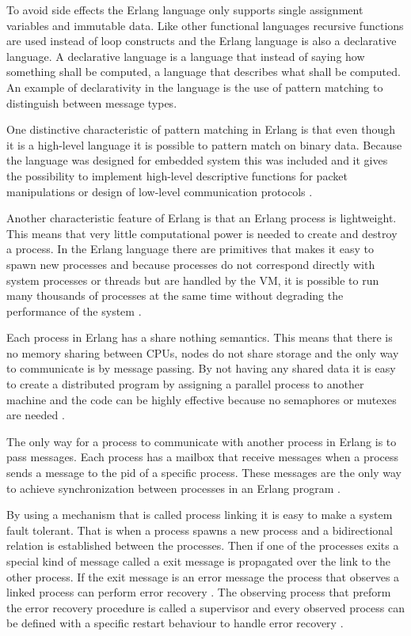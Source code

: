 To avoid side effects the Erlang language only supports single assignment variables and immutable data. Like other functional languages recursive functions are used instead of loop constructs and the Erlang language is also a declarative language. A declarative language is a language that instead of saying how something shall be computed, a language that describes what shall be computed. An example of declarativity in the language is the use of pattern matching to distinguish between message types. 

 One distinctive characteristic of pattern matching in Erlang is that even though it is a high-level language it is possible to pattern match on binary data. Because the language was designed for embedded system this was included and it gives the possibility to implement high-level descriptive functions for packet manipulations or design of low-level communication protocols \citep{sivieri2012erlang}.

Another characteristic feature of Erlang is that an Erlang process is lightweight. This means that very little computational power is needed to create and destroy a process. In the Erlang language there are primitives that makes it easy to spawn new processes and because processes do not correspond directly with system processes or threads but are handled by the VM, it is possible to run many thousands of processes at the same time without degrading the performance of the system \citep{armstrong2003concurrency}. 

Each process in Erlang has a share nothing semantics. This means that there is no memory sharing between CPUs, nodes do not share storage and the only way to communicate is by message passing. By not having any shared data it is easy to create a distributed program by assigning a parallel process to another machine and the code can be highly effective because no semaphores or mutexes are needed \citep{armstrong2003concurrency}.

The only way for a process to communicate with another process in Erlang is to pass messages. Each process has a mailbox that receive messages when a process sends a message to the pid of a specific process. These messages are the only way to achieve synchronization between processes in an Erlang program \citep{armstrong2003concurrency}.

By using a mechanism that is called process linking it is easy to make a system fault tolerant. That is when a process spawns a new process and a bidirectional relation is established between the processes. Then if one of the processes exits a special kind of message called a exit message is propagated over the link to the other process. If the exit message is an error message the process that observes a linked process can perform error recovery \citep{armstrong2003concurrency}. The observing process that preform the error recovery procedure is called a supervisor and every observed process can be defined with a specific restart behaviour to handle error recovery \citep{armstrong2003concurrency, sivieri2012erlang}. 


